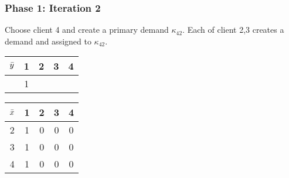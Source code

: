 \documentclass[handout, hyperref, xcolor=dvipsnames]{beamer}
\begin{document}
\begin{frame}
  \frametitle{Phase 1: Iteration 2}

  Choose client 4 and create a primary demand $\kappa_{42}$. Each of
  client 2,3 creates a demand and assigned to $\kappa_{42}$.

  \begin{minipage}{.45\linewidth}
  \begin{table}
  \begin{subtable}{1\textwidth}
    \centering
    \begin{tabular}{c | c c c c}
      ${\bar y}$ & 1 & 2 & 3 & 4\\
      \hline
      & 1 &  &  & \\
    \end{tabular}
  \end{subtable}
%
  \begin{subtable}{1\textwidth}
    \centering
    \begin{tabular}{c | c c c c}
      ${\bar x}$ & 1 & 2 & 3 & 4\\
      \hline
      2 & 1 & 0 & 0 & 0\\
      3 & 1 & 0 & 0 & 0\\
      4 & 1 & 0 & 0 & 0\\
    \end{tabular}
  \end{subtable}
\end{table}
  \end{minipage}
  \begin{minipage}{.45\linewidth}
  \end{minipage}
\end{frame}
\end{document}
